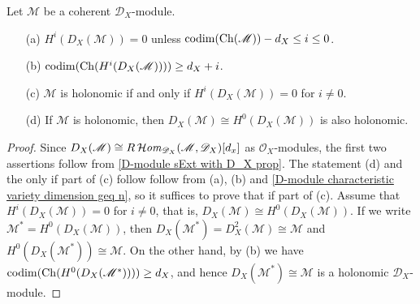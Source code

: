 \begin{proposition}\label{D-module dual of holonomic prop}
Let $\mathscr{M}$ be a coherent $\mathscr{D}_X$-module.
\begin{enumerate}
    \item[(a)] $H^i(D_X(\mathscr{M}))=0$ unless $\mathrm{codim}(\mathrm{Ch}(\mathscr{M}))-d_X\leq i\leq 0$.
    \item[(b)] $\mathrm{codim}(\mathrm{Ch}(H^i(D_X(\mathscr{M}))))\geq d_X+i$.
    \item[(c)] $\mathscr{M}$ is holonomic if and only if $H^i(D_X(\mathscr{M}))=0$ for $i\neq 0$.
    \item[(d)] If $\mathscr{M}$ is holonomic, then $D_X(\mathscr{M})\cong H^0(D_X(\mathscr{M}))$ is also holonomic.
\end{enumerate}
\end{proposition}
\begin{proof}
Since $D_X(\mathscr{M})\cong R\operatorname{\mathcal{H}\hspace*{-0.4pt}\textit{om}\hspace{0.5pt}}_{\mathscr{D}_X}(\mathscr{M},\mathscr{D}_X)[d_x]$ as $\mathscr{O}_X$-modules, the first two assertions follow from \cref{D-module sExt with D_X prop}. The statement (d) and the only if part of (c) follow follow from (a), (b) and \cref{D-module characteristic variety dimension geq n}, so it suffices to prove that if part of (c). Assume that $H^i(D_X(\mathscr{M}))=0$ for $i\neq 0$, that is, $D_X(\mathscr{M})\cong H^0(D_X(\mathscr{M}))$. If we write $\mathscr{M}^*=H^0(D_X(\mathscr{M}))$, then $D_X(\mathscr{M}^*)=D^2_X(\mathscr{M})\cong\mathscr{M}$ and $H^0(D_X(\mathscr{M}^*))\cong \mathscr{M}$. On the other hand, by (b) we have $\mathrm{codim}(\mathrm{Ch}(H^0(D_X(\mathscr{M}^*))))\geq d_X$, and hence $D_X(\mathscr{M}^*)\cong\mathscr{M}$ is a holonomic $\mathscr{D}_X$-module.
\end{proof}

